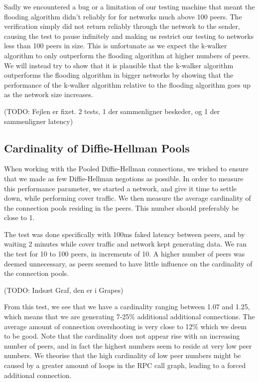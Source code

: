 Sadly we encountered a bug or a limitation of our testing machine that meant the flooding algorithm didn't reliably for for networks much above 100 peers. The verification simply did not return reliably through the network to the sender, causing the test to pause infinitely and making us restrict our testing to networks less than 100 peers in size. This is unfortunate as we expect the k-walker algorithm to only outperform the flooding algorithm at higher numbers of peers. We will instead try to show that it is plausible that the k-walker algorithm outperforms the flooding algorithm in bigger networks by showing that the performance of the k-walker algorithm relative to the flooding algorithm goes up as the network size increases.

(TODO: Fejlen er fixet. 2 tests, 1 der sammenligner beskeder, og 1 der sammenligner latency)

\subsection{Cardinality of Diffie-Hellman Pools}

When working with the Pooled Diffie-Hellman connections, we wished to ensure that we made as few Diffie-Hellman negotions as possible. In order to measure this performance parameter, we started a network, and give it time to settle down, while performing cover traffic. We then measure the average cardinality of the connection pools residing in the peers. This number should preferably be close to 1.

The test was done specifically with 100ms faked latency between peers, and by waiting 2 minutes while cover traffic and network kept generating data. We ran the test for 10 to 100 peers, in increments of 10. A higher number of peers was deemed unnecessary, as peers seemed to have little influence on the cardinality of the connection pools.

(TODO: Indsæt Graf, den er i Grapes)

From this test, we see that we have a cardinality ranging between 1.07 and 1.25, which means that we are generating 7-25\% additional additional connections. The average amount of connection overshooting is very close to 12\% which we deem to be good. Note that the cardinality does not appear rise with an increasing number of peers, and in fact the highest numbers seem to reside at very low peer numbers. We theorise that the high cardinality of low peer numbers might be caused by a greater amount of loops in the RPC call graph, leading to a forced additional connection.
